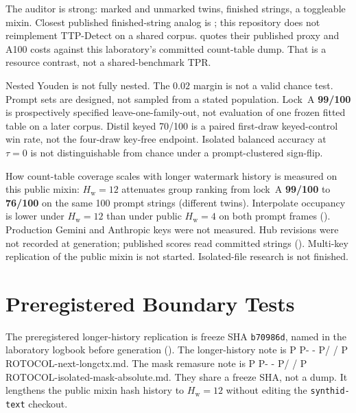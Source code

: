 \documentclass[11pt,a4paper]{article}
\makeatletter
\newcommand{\ttfile}[1]{\bgroup\ttfamily\ttfile@scan#1\relax\egroup}
\def\ttfile@scan#1{%
  \ifx#1\relax
  \else
    \ifx#1-%
      -\penalty0 %
    \else
      \ifx#1/%
        /\penalty0 %
      \else
        #1%
      \fi
    \fi
    \expandafter\ttfile@scan
  \fi}
\theoremstyle{definition}
\newcommand{\Hw}{H_{\mathrm{w}}}
\makeatother
\begin{document}
The auditor is strong: marked and unmarked twins, finished strings, a
toggleable mixin. Closest published finished-string analog is
\citet{wang2026ttp}; this repository does not reimplement TTP-Detect on
a shared corpus.  quotes their published proxy and
A100 costs against this laboratory's committed count-table dump. That
is a resource contrast, not a shared-benchmark TPR.

Nested Youden is not fully nested. The $0.02$ margin is not a valid
chance test. Prompt sets are designed, not sampled from a stated
population. Lock~A \textbf{99/100} is prospectively specified
leave-one-family-out, not evaluation of one frozen fitted table on a
later corpus. Distil keyed 70/100 is a paired first-draw keyed-control win rate,
not the four-draw key-free endpoint. Isolated balanced accuracy at
$\tau=0$ is not distinguishable from chance under a prompt-clustered
sign-flip.

How count-table coverage scales with longer watermark history is
measured on this public mixin: $\Hw=12$ attenuates group ranking from lock~A
\textbf{99/100} to \textbf{76/100} on the same 100 prompt strings
(different twins). Interpolate occupancy is lower under $\Hw=12$ than
under public $\Hw=4$ on both prompt frames ().
Production Gemini and Anthropic keys were not measured.
Hub revisions were not recorded at generation; published scores read
committed strings ().
Multi-key replication of the public mixin is not started. Isolated-file
research is not finished.

\FloatBarrier
\section{Preregistered Boundary Tests}
\label{sec:next}

The preregistered longer-history replication is freeze SHA
\texttt{b70986d}, named in the laboratory logbook before generation
(). The longer-history note is
\ttfile{PROTOCOL-next-longctx.md}. The mask remasure note is
\ttfile{PROTOCOL-isolated-mask-absolute.md}. They share a freeze SHA,
not a dump. It lengthens the public mixin hash history to $\Hw=12$
without editing the \texttt{synthid-text} checkout.
\end{document}
